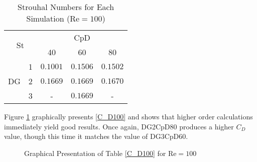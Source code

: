 \begin{table}[H]
	\centering
	\def\arraystretch{1.5}
	\begin{tabular}{|c|c|c|c|c|}
		\hline
		\multicolumn{2}{|c|}{\multirow{2}{*}{St}} & \multicolumn{3}{c|}{CpD} \\ \cline{3-5} 
		\multicolumn{2}{|c|}{}                       & 40     & 60    & 80    \\ \hline
		\multirow{3}{*}{DG}            & 1           &    $0.1001$    &    $0.1506$   &    $0.1502$    \\ \cline{2-5} 
		& 2           &     $0.1669$   &    $0.1669$   &     $0.1670$   \\ \cline{2-5} 
		& 3           &     -   &    $0.1669$   &    -    \\ \hline
	\end{tabular}
	\caption{Strouhal Numbers for Each Simulation ($\text{Re} = 100$)}	
	\label{Str100}
\end{table}
Figure \ref{fig:C_D100} graphically presents \cref{C_D100} and shows that higher order calculations immediately yield good results. Once again, DG2CpD80 produces a higher $C_D$ value, though this time it matches the value of DG3CpD60. 
	\begin{figure}[htp]	
		\centering
		\caption{Graphical Presentation of Table \ref{C_D100} for $\text{Re} = 100$}
		\label{fig:C_D100}	
	\end{figure}

